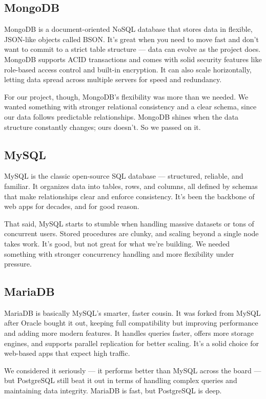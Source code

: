 \documentclass[12pt,titlepage]{article}
\begin{document}
\subsection{MongoDB}
MongoDB is a document-oriented NoSQL database that stores data in flexible, JSON-like objects called BSON. It’s great when you need to move fast and don’t want to commit to a strict table structure — data can evolve as the project does. MongoDB supports ACID transactions and comes with solid security features like role-based access control and built-in encryption. It can also scale horizontally, letting data spread across multiple servers for speed and redundancy.

For our project, though, MongoDB’s flexibility was more than we needed. We wanted something with stronger relational consistency and a clear schema, since our data follows predictable relationships. MongoDB shines when the data structure constantly changes; ours doesn’t. So we passed on it.

\subsection{MySQL}
MySQL is the classic open-source SQL database — structured, reliable, and familiar. It organizes data into tables, rows, and columns, all defined by schemas that make relationships clear and enforce consistency. It’s been the backbone of web apps for decades, and for good reason.

That said, MySQL starts to stumble when handling massive datasets or tons of concurrent users. Stored procedures are clunky, and scaling beyond a single node takes work. It’s good, but not great for what we’re building. We needed something with stronger concurrency handling and more flexibility under pressure.

\subsection{MariaDB}
MariaDB is basically MySQL’s smarter, faster cousin. It was forked from MySQL after Oracle bought it out, keeping full compatibility but improving performance and adding more modern features. It handles queries faster, offers more storage engines, and supports parallel replication for better scaling. It’s a solid choice for web-based apps that expect high traffic.

We considered it seriously — it performs better than MySQL across the board — but PostgreSQL still beat it out in terms of handling complex queries and maintaining data integrity. MariaDB is fast, but PostgreSQL is deep.
\end{document}
